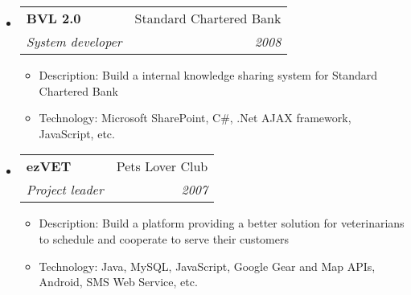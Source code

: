 \documentclass[twoside,letterpaper,11pt]{article}
\makeatletter
\newcommand{\resitem}[1]{\item #1 \vspace{-5pt}}
\newcommand{\ressubheading}[4]{
\begin{tabular*}{7in}{l@{\extracolsep{\fill}}r}
		\textbf{#1} & #2 \\
		\textit{#3} & \textit{#4} \\
\end{tabular*}\vspace{-6pt}}
\makeatother
\begin{document}
\begin{itemize}
\item
	\ressubheading{BVL 2.0}{Standard Chartered Bank}{System developer}{2008}
	\begin{itemize}
		\resitem{Description: Build a internal knowledge sharing system for Standard Chartered Bank}
		\resitem{Technology: Microsoft SharePoint, C\#, .Net AJAX framework, JavaScript, etc.}
	\end{itemize}
\newpage
{}
\item
	\ressubheading{ezVET}{Pets Lover Club}{Project leader}{2007}
	\begin{itemize}
		\resitem{Description: Build a platform providing a better solution for veterinarians to schedule and cooperate to serve their customers}
		\resitem{Technology: Java, MySQL, JavaScript, Google Gear and Map APIs, Android, SMS Web Service, etc.}
	\end{itemize}
\end{itemize}
\end{document}
